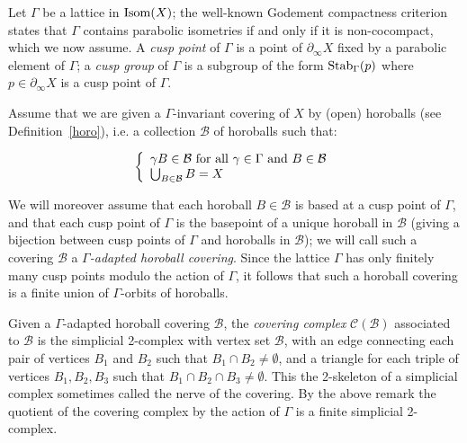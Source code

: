 \documentclass{article}[12pt]
\begin{document}
Let $\Gamma$ be a lattice in ${\rm Isom}(X)$; the well-known Godement compactness criterion states that $\Gamma$ contains parabolic isometries if and only if it is non-cocompact, which we now assume. A \emph{cusp point} of $\Gamma$ is a point of $\partial_\infty X$ fixed by a parabolic element of $\Gamma$; a \emph{cusp group} of $\Gamma$ is a subgroup of the form ${\rm Stab}_\Gamma(p)$ where $p \in \partial_\infty X$ is a cusp point of $\Gamma$.

Assume that we are given a $\Gamma$-invariant covering of $X$ by (open) horoballs (see Definition~\ref{horo}), i.e. a collection $\mathcal{B}$ of horoballs such that:

$$\left\lbrace\begin{array}{l}
\gamma B \in \mathcal{B} \ {\rm for \ all} \ \gamma \in \Gamma \ {\rm and} \ B \in \mathcal{B} \\
\bigcup_{B \in \mathcal{B}} B = X
\end{array}\right.
$$

We will moreover assume that each horoball $B \in \mathcal{B}$ is based at a cusp point of $\Gamma$, and that each cusp point of $\Gamma$ is the basepoint of a unique horoball in $\mathcal{B}$ (giving a bijection between cusp points of $\Gamma$ and horoballs in $\mathcal{B}$); we will call such a covering $\mathcal{B}$ a \emph{$\Gamma$-adapted horoball covering}. Since the lattice $\Gamma$ has only finitely many cusp points modulo the action of $\Gamma$, it follows that such a horoball covering is a finite union of $\Gamma$-orbits of horoballs. 

Given a $\Gamma$-adapted horoball covering $\mathcal{B}$, the 
\emph{covering complex} $\mathcal{C}(\mathcal{B})$ associated to $\mathcal{B}$ is the simplicial 2-complex with vertex set $\mathcal{B}$, with an edge connecting each pair of vertices $B_1$ and $B_2$ such that $B_1 \cap B_2 \neq \emptyset$, and a triangle for each triple of vertices $B_1, B_2, B_3$ such that  $B_1 \cap B_2 \cap B_3 \neq \emptyset$. This the 2-skeleton of a simplicial complex sometimes called the nerve of the covering. By the above remark the quotient of the covering complex by the action of $\Gamma$ is a finite simplicial 2-complex.

\end{document}
